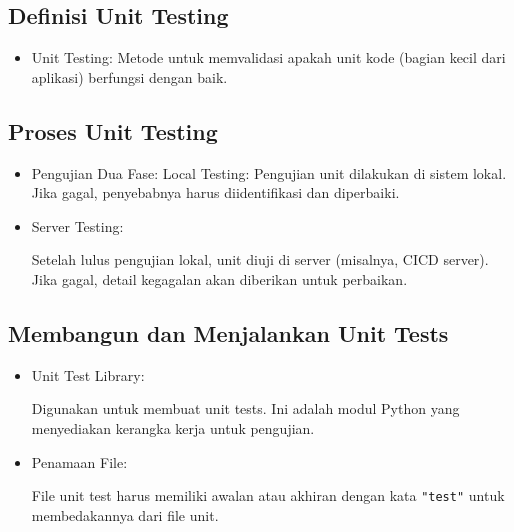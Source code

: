 \documentclass{article}
\begin{document}
\subsection{Definisi Unit Testing}
\begin{itemize}
    \item Unit Testing: Metode untuk memvalidasi apakah unit kode (bagian kecil dari aplikasi) berfungsi dengan baik.
\end{itemize}

\subsection{Proses Unit Testing}
\begin{itemize}
    \item Pengujian Dua Fase:
          Local Testing: Pengujian unit dilakukan di sistem lokal. Jika gagal, penyebabnya harus diidentifikasi dan diperbaiki.
    \item Server Testing:

          Setelah lulus pengujian lokal, unit diuji di server (misalnya, CICD server). Jika gagal, detail kegagalan akan diberikan untuk perbaikan.
\end{itemize}

\subsection{Membangun dan Menjalankan Unit Tests}
\begin{itemize}
    \item Unit Test Library:

          Digunakan untuk membuat unit tests. Ini adalah modul Python yang menyediakan kerangka kerja untuk pengujian.
    \item Penamaan File:

          File unit test harus memiliki awalan atau akhiran dengan kata \verb|"test"| untuk membedakannya dari file unit.
\end{itemize}
\end{document}
